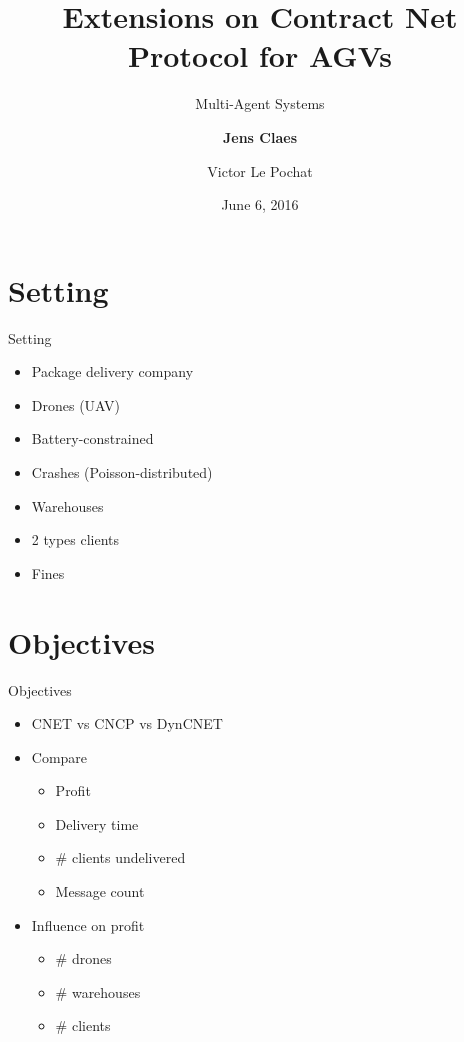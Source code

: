 \documentclass[notes]{beamer}
\title{Extensions on Contract Net Protocol for AGVs}
\subtitle{Multi-Agent Systems}
\author{\textbf{Jens Claes} \and Victor Le Pochat}
\date{June 6, 2016}
\begin{document}
	\frame{\titlepage}

	\section{Setting}
	\begin{frame}{Setting}
		\begin{itemize}
		\item Package delivery company
		\item Drones (UAV)
		\item Battery-constrained
		\item Crashes (Poisson-distributed)
		\item Warehouses
		\item 2 types clients
		\item Fines
		\end{itemize}
	\end{frame}

	\section{Objectives}
	\begin{frame}{Objectives}
		\begin{itemize}
		\item CNET vs CNCP vs DynCNET
		\item Compare
			\begin{itemize}
			\item Profit
			\item Delivery time
			\item \# clients undelivered
			\item Message count
			\end{itemize}
		\item Influence on profit
			\begin{itemize}
			\item \# drones
			\item \# warehouses
			\item \# clients
			\end{itemize}
		\end{itemize}
	\end{frame}
		
	
\end{document}

